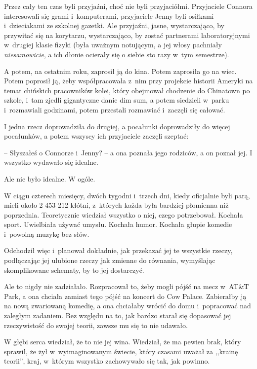 \documentclass[oneside,polish,11pt,rmheadings]{mwbk}
\begin{document}
Przez cały ten czas byli przyjaźni, choć nie byli przyjaciółmi. Przyjaciele Connora interesowali się grami i~komputerami, przyjaciele Jenny byli osiłkami i~dzieciakami ze szkolnej gazetki. Ale przyjaźni, jasne, wystarczająco, by przywitać się na korytarzu, wystarczająco, by zostać partnerami laboratoryjnymi w~drugiej klasie fizyki (była uważnym notującym, a jej włosy pachniały \textit{niesamowicie}, a ich dłonie ocierały się o siebie sto razy w~tym semestrze). 


A potem, na ostatnim roku, zaprosił ją do kina. Potem zaprosiła go na wiec. Potem poprosił ją, żeby współpracowała z~nim przy projekcie historii Ameryki na temat chińskich pracowników kolei, który obejmował chodzenie do Chinatown po szkole, i~tam zjedli gigantyczne danie dim sum, a potem siedzieli w~parku i~rozmawiali godzinami, potem przestali rozmawiać i~zaczęli się całować. 


I jedna rzecz doprowadziła do drugiej, a pocałunki doprowadziły do więcej pocałunków, a potem wszyscy ich przyjaciele zaczęli szeptać: 

-- Słyszałeś o Connorze i~Jenny? -- a ona poznała jego rodziców, a on poznał jej. I wszystko wydawało się idealne. 


Ale nie było idealne. W ogóle. 


W ciągu czterech miesięcy, dwóch tygodni i~trzech dni, kiedy oficjalnie byli parą, mieli około 2 453 212 kłótni, z~których każda była bardziej płomienna niż poprzednia. Teoretycznie wiedział wszystko o niej, czego potrzebował. Kochała sport. Uwielbiała używać umysłu. Kochała humor. Kochała głupie komedie i~powolną muzykę bez słów. 


Odchodził więc i~planował dokładnie, jak przekazać jej te wszystkie rzeczy, podłączając jej ulubione rzeczy jak zmienne do równania, wymyślając skomplikowane schematy, by to jej dostarczyć. 


Ale to nigdy nie zadziałało. Rozpracował to, żeby mogli pójść na mecz w~AT\&T Park, a ona chciała zamiast tego pójść na koncert do Cow Palace. Zabierałby ją na nową zwariowaną komedię, a ona chciałaby wrócić do domu i~popracować nad zaległym zadaniem. Bez względu na to, jak bardzo starał się dopasować jej rzeczywistość do swojej teorii, zawsze mu się to nie udawało. 


W głębi serca wiedział, że to nie jej wina. Wiedział, że ma pewien brak, który sprawił, że żył w~wyimaginowanym świecie, który czasami uważał za ,,krainę teorii'', kraj, w~którym wszystko zachowywało się tak, jak powinno. 
\end{document}
